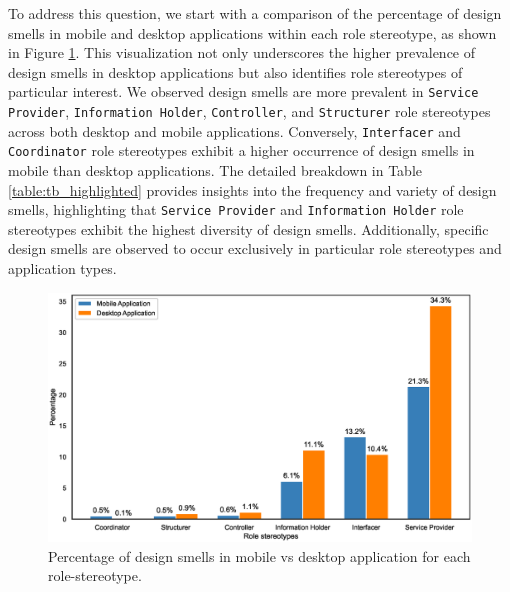 \documentclass[AMA,Times1COL]{WileyNJDv5} %
\begin{document}
	To address this question, we start with a comparison of the percentage of design smells in mobile and desktop applications within each role stereotype, as shown in Figure \ref{fig:bar_chart_percentage}. This visualization not only underscores the higher prevalence of design smells in desktop applications but also identifies role stereotypes of particular interest. We observed design smells are more prevalent in {\tt Service Provider}, {\tt Information Holder}, {\tt Controller}, and {\tt Structurer} role stereotypes across both desktop and mobile applications. Conversely, {\tt Interfacer} and {\tt Coordinator} role stereotypes exhibit a higher occurrence of design smells in mobile than desktop applications. The detailed breakdown in Table \ref{table:tb_highlighted} provides insights into the frequency and variety of design smells, highlighting that {\tt Service Provider} and {\tt Information Holder} role stereotypes exhibit the highest diversity of design smells. Additionally, specific design smells are observed to occur exclusively in particular role stereotypes and application types.
	
	\begin{figure}[h!]
		\centering
		\includegraphics[scale=0.55]{figures/barchart_mobile_desktop}
		\caption{Percentage of design smells in mobile vs desktop application for each role-stereotype.}
		\label{fig:bar_chart_percentage}
	\end{figure}
	
\end{document}
